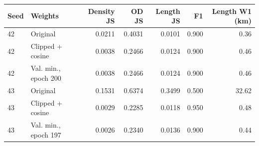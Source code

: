 \begin{center}\small\begin{tabular}{@{}llrrrrr@{}}\toprule
Seed & Weights & Density JS & OD JS & Length JS & F1 & Length W1 (km)\\\midrule
42 & Original & 0.0211 & 0.4031 & 0.0101 & 0.900 & 0.36\\
42 & Clipped + cosine & 0.0038 & 0.2466 & 0.0124 & 0.900 & 0.46\\
42 & Val. min., epoch 200 & 0.0038 & 0.2466 & 0.0124 & 0.900 & 0.46\\
\midrule
43 & Original & 0.1531 & 0.6374 & 0.3499 & 0.500 & 32.62\\
43 & Clipped + cosine & 0.0029 & 0.2285 & 0.0118 & 0.950 & 0.48\\
43 & Val. min., epoch 197 & 0.0026 & 0.2340 & 0.0136 & 0.900 & 0.44\\
\bottomrule\end{tabular}\end{center}
